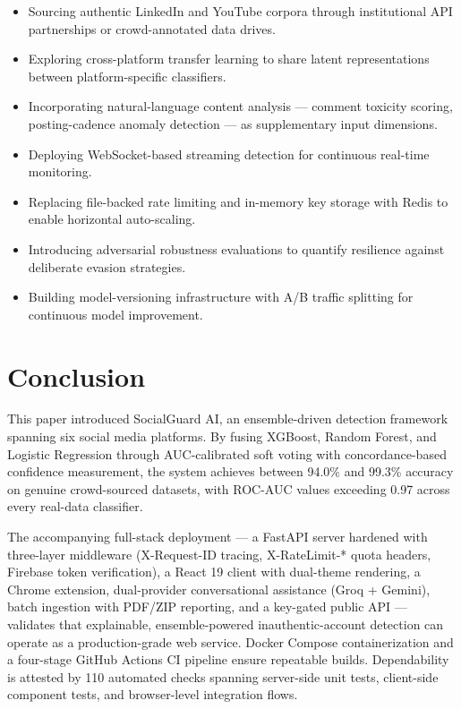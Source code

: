 \documentclass[conference]{IEEEtran}
\begin{document}
\begin{itemize}
    \item Sourcing authentic LinkedIn and YouTube corpora through institutional API partnerships or crowd-annotated data drives.
    \item Exploring cross-platform transfer learning to share latent representations between platform-specific classifiers.
    \item Incorporating natural-language content analysis --- comment toxicity scoring, posting-cadence anomaly detection --- as supplementary input dimensions.
    \item Deploying WebSocket-based streaming detection for continuous real-time monitoring.
    \item Replacing file-backed rate limiting and in-memory key storage with Redis to enable horizontal auto-scaling.
    \item Introducing adversarial robustness evaluations to quantify resilience against deliberate evasion strategies.
    \item Building model-versioning infrastructure with A/B traffic splitting for continuous model improvement.
\end{itemize}

\section{Conclusion}

This paper introduced SocialGuard AI, an ensemble-driven detection framework spanning six social media platforms. By fusing XGBoost, Random Forest, and Logistic Regression through AUC-calibrated soft voting with concordance-based confidence measurement, the system achieves between 94.0\% and 99.3\% accuracy on genuine crowd-sourced datasets, with ROC-AUC values exceeding 0.97 across every real-data classifier.

The accompanying full-stack deployment --- a FastAPI server hardened with three-layer middleware (X-Request-ID tracing, X-RateLimit-* quota headers, Firebase token verification), a React 19 client with dual-theme rendering, a Chrome extension, dual-provider conversational assistance (Groq + Gemini), batch ingestion with PDF/ZIP reporting, and a key-gated public API --- validates that explainable, ensemble-powered inauthentic-account detection can operate as a production-grade web service. Docker Compose containerization and a four-stage GitHub Actions CI pipeline ensure repeatable builds. Dependability is attested by 110 automated checks spanning server-side unit tests, client-side component tests, and browser-level integration flows.
\end{document}
